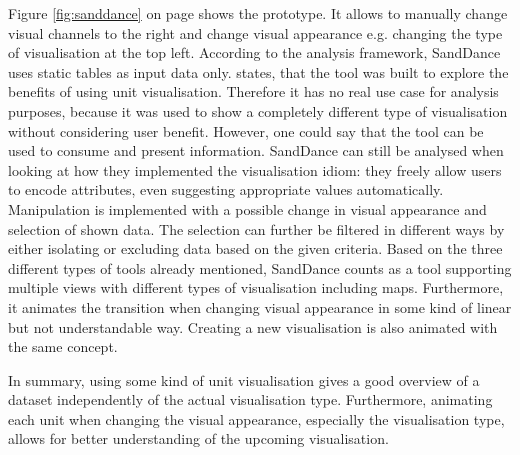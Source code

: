 Figure \ref{fig:sanddance} on page \pageref{fig:sanddance} shows the prototype. It allows to manually change visual channels to the right and change visual appearance e.g. changing the type of visualisation at the top left. According to the analysis framework, SandDance uses static tables as input data only. \citeauthor{Drucker2015} states, that the tool was built to explore the benefits of using unit visualisation. Therefore it has no real use case for analysis purposes, because it was used to show a completely different type of visualisation without considering user benefit. However, one could say that the tool can be used to consume and present information.
SandDance can still be analysed when looking at how they implemented the visualisation idiom: they freely allow users to encode attributes, even suggesting appropriate values automatically. Manipulation is implemented with a possible change in visual appearance and selection of shown data. The selection can further be filtered in different ways by either isolating or excluding data based on the given criteria.
Based on the three different types of tools already mentioned, SandDance counts as a tool supporting multiple views with different types of visualisation including maps. Furthermore, it animates the transition when changing visual appearance in some kind of linear but not understandable way. Creating a new visualisation is also animated with the same concept.

\cbstart
In summary, using some kind of unit visualisation gives a good overview of a dataset independently of the actual visualisation type. Furthermore, animating each unit when changing the visual appearance, especially the visualisation type, allows for better understanding of the upcoming visualisation.
\cbend